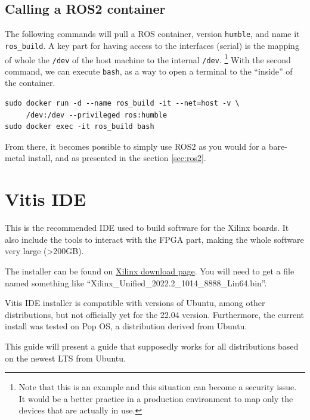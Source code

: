 \documentclass[10pt]{article}
\begin{document}
\subsection{Calling a ROS2 container}
\label{sec:call-ros2-cont}
The following commands will pull a ROS container, version \verb|humble|, and name it \verb|ros_build|.
A key part for having access to the interfaces (serial) is the mapping of whole the \verb|/dev| of  the host machine to the
internal \verb|/dev|. \footnote{Note that this is an example and this situation can become a security issue. It would be a better practice
in a production environment to map only the devices that are actually in use.}
With the second command, we can execute \verb|bash|, as a way to open a terminal to the ``inside'' of the container.
\begin{tcolorbox}
\begin{verbatim}
sudo docker run -d --name ros_build -it --net=host -v \
     /dev:/dev --privileged ros:humble
sudo docker exec -it ros_build bash
\end{verbatim}
\end{tcolorbox}

From there, it becomes possible to simply use ROS2 as you would for a bare-metal install, and as presented in the section \ref{sec:ros2}.



\section{Vitis IDE}
\label{sec:vitis-ide}
This is the recommended IDE used to build software for the Xilinx boards.
It also include the tools to interact with the FPGA part, making the whole
software very large (>200GB).

The installer can be found on \href{https://www.xilinx.com/support/download/index.html/content/xilinx/en/downloadNav/vitis.html}{Xilinx download page}. You will need to get
a file named something like ``Xilinx\_Unified\_2022.2\_1014\_8888\_Lin64.bin''.

Vitis IDE installer is compatible with versions of Ubuntu, among other distributions,
but not officially yet for the 22.04 version.
Furthermore, the current install was tested on Pop OS, a distribution derived from Ubuntu.

This guide will present a guide that supposedly works for all distributions based on the newest
LTS from Ubuntu.
\end{document}
